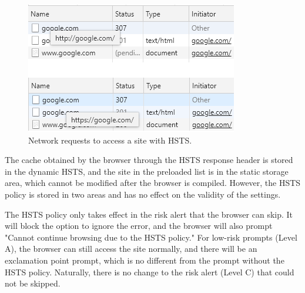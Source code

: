 \begin{figure}[htbp]
\centerline{\includegraphics{Figure/fig5.png}}
\caption{Network requests to access a site with HSTS.}
\label{fig}
\end{figure}

The cache obtained by the browser through the HSTS response header is stored in the dynamic HSTS, and the site in the preloaded list is in the static storage area, which cannot be modified after the browser is compiled. However, the HSTS policy is stored in two areas and has no effect on the validity of the settings.

The HSTS policy only takes effect in the risk alert that the browser can skip. It will block the option to ignore the error, and the browser will also prompt "Cannot continue browsing due to the HSTS policy." For low-risk prompts (Level A), the browser can still access the site normally, and there will be an exclamation point prompt, which is no different from the prompt without the HSTS policy. Naturally, there is no change to the risk alert (Level C) that could not be skipped.

